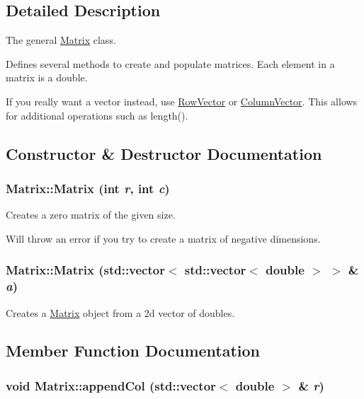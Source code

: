 \subsection{Detailed Description}
The general \hyperlink{class_matrix}{Matrix} class. 

Defines several methods to create and populate matrices. Each element in a matrix is a double.

If you really want a vector instead, use \hyperlink{class_row_vector}{RowVector} or \hyperlink{class_column_vector}{ColumnVector}. This allows for additional operations such as length(). 

\subsection{Constructor \& Destructor Documentation}
\hypertarget{class_matrix_07a3cee5bc286ca27ceffe81ce5a2d01}{
\subsubsection[{Matrix}]{\setlength{\rightskip}{0pt plus 5cm}Matrix::Matrix (int {\em r}, \/  int {\em c})}}
\label{class_matrix_07a3cee5bc286ca27ceffe81ce5a2d01}


Creates a zero matrix of the given size. 

Will throw an error if you try to create a matrix of negative dimensions. \hypertarget{class_matrix_0db283ef4ea2660f8d0c1b58f9e74f49}{
\subsubsection[{Matrix}]{\setlength{\rightskip}{0pt plus 5cm}Matrix::Matrix (std::vector$<$ std::vector$<$ double $>$ $>$ \& {\em a})}}
\label{class_matrix_0db283ef4ea2660f8d0c1b58f9e74f49}


Creates a \hyperlink{class_matrix}{Matrix} object from a 2d vector of doubles. 



\subsection{Member Function Documentation}
\hypertarget{class_matrix_726f7ae83284c090af821752628974af}{
\subsubsection[{appendCol}]{\setlength{\rightskip}{0pt plus 5cm}void Matrix::appendCol (std::vector$<$ double $>$ \& {\em r})}}
\label{class_matrix_726f7ae83284c090af821752628974af}


